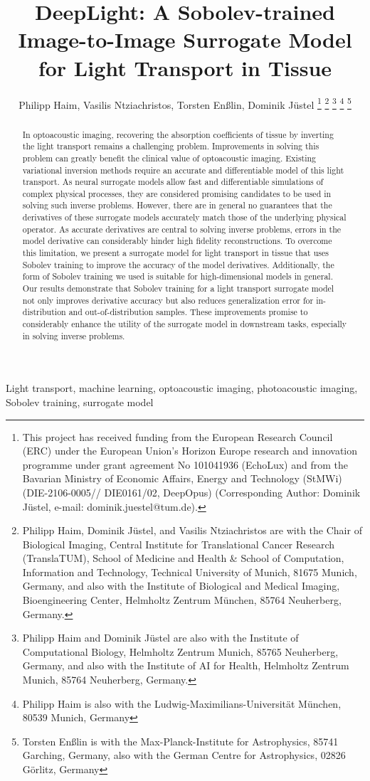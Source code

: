 \documentclass[journal,twoside,web]{ieeecolor}
\title{DeepLight: A Sobolev-trained Image-to-Image Surrogate Model for Light Transport in Tissue}
\author{Philipp Haim, Vasilis Ntziachristos, Torsten En{\ss}lin, Dominik J\"ustel
    \thanks{This project has received funding from the European Research Council (ERC) under the European Union’s Horizon Europe research and innovation programme under grant agreement No 101041936 (EchoLux) and from the Bavarian Ministry of Economic Affairs, Energy and Technology (StMWi) (DIE-2106-0005// DIE0161/02, DeepOpus) (Corresponding Author: Dominik J\"ustel, e-mail: dominik.juestel@tum.de).}
    \thanks{Philipp Haim, Dominik Jüstel, and Vasilis Ntziachristos are with the Chair of Biological Imaging, Central Institute for Translational Cancer Research (TranslaTUM), School of Medicine and Health \& School of Computation, Information and Technology, Technical University of Munich, 81675 Munich, Germany,
        and also with the Institute of Biological and Medical Imaging, Bioengineering Center, Helmholtz Zentrum München, 85764 Neuherberg, Germany.
    }
    \thanks{Philipp Haim and Dominik J\"ustel are also with the Institute of Computational Biology, Helmholtz Zentrum Munich, 85765 Neuherberg, Germany,
    and also with the Institute of AI for Health, Helmholtz Zentrum Munich, 85764 Neuherberg, Germany.}
    \thanks{Philipp Haim is also with the Ludwig-Maximilians-Universität München, 80539 Munich, Germany}
    \thanks{Torsten En{\ss}lin is with the Max-Planck-Institute for Astrophysics, 85741 Garching, Germany,
        also with the German Centre for Astrophysics, 02826 G\"orlitz, Germany}
}
\begin{document}
\maketitle
\begin{abstract}
    In optoacoustic imaging, recovering the absorption coefficients of tissue by inverting the light transport remains a challenging problem. %
    Improvements in solving this problem can greatly benefit the clinical value of optoacoustic imaging. %
    Existing variational inversion methods require an accurate and differentiable model of this light transport. %
    As neural surrogate models allow fast and differentiable simulations of complex physical processes, they are considered promising candidates to be used in solving such inverse problems. %
    However, there are in general no guarantees that the derivatives of these surrogate models accurately match those of the underlying physical operator. %
    As accurate derivatives are central to solving inverse problems, errors in the model derivative can considerably hinder high fidelity reconstructions. %
    To overcome this limitation, we present a surrogate model for light transport in tissue that uses Sobolev training to improve the accuracy of the model derivatives. %
    Additionally, the form of Sobolev training we used is suitable for high-dimensional models in general. %
    Our results demonstrate that Sobolev training for a light transport surrogate model not only improves derivative accuracy but also reduces generalization error for in-distribution and out-of-distribution samples. %
    These improvements promise to considerably enhance the utility of the surrogate model in downstream tasks, especially in solving inverse problems. %
\end{abstract}

\begin{IEEEkeywords}
Light transport, machine learning, optoacoustic imaging, photoacoustic imaging, Sobolev training, surrogate model
\end{IEEEkeywords}
\end{document}
